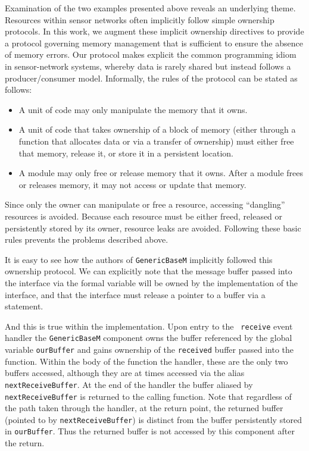 Examination of the two examples presented above reveals an underlying
theme.  Resources within sensor networks often implicitly follow
simple ownership protocols.  In this work, we augment these implicit
ownership directives to provide a protocol governing memory management
that is sufficient to ensure the absence of memory errors.  Our
protocol makes explicit the common programming idiom in sensor-network
systems, whereby data is rarely shared but instead follows a
producer/consumer model.  
%
Informally, the rules of the protocol can be stated as follows:
%
\begin{itemize}
%
\item A unit of code may only manipulate the memory that it owns.
%
\item A unit of code that takes ownership of a block of memory (either
through a function that allocates data or via a transfer of ownership)
must either free that memory, release it, or store it in a persistent
location.
%
\item A module may only free or release memory that it owns.  After a
module frees or releases memory, it may not access or update that
memory.
%
\end{itemize}
%
Since only the owner can manipulate or free a resource, accessing
``dangling'' resources is avoided.  Because each resource must be
either freed, released or persistently stored by its owner, resource
leaks are avoided.  
%
Following these basic rules prevents the problems described above.



\smallskip{}

It is easy to see how the authors of {\tt GenericBaseM} implicitly
followed this ownership protocol.  We can explicitly note that the
message buffer passed into the  interface via the formal
variable  will be owned
by the implementation of the interface, and that the 
interface must release a pointer to a buffer via a 
statement.

And this is true within the implementation.  Upon entry to the {\tt
receive} event handler the {\tt GenericBaseM} component owns the
buffer referenced by the global variable {\tt ourBuffer} and gains
ownership of the {\tt received} buffer passed into the function.
Within the body of the function the handler, these are the only two
buffers accessed, although they are at times accessed via the alias
{\tt nextReceiveBuffer}.  At the end of the handler the buffer aliased
by {\tt nextReceiveBuffer} is returned to the calling function.  Note
that regardless of the path taken through the handler, at the return
point, the returned buffer (pointed to by {\tt nextReceiveBuffer}) is
distinct from the buffer persistently stored in {\tt ourBuffer}.  Thus
the returned buffer is not accessed by this component after the
return.

